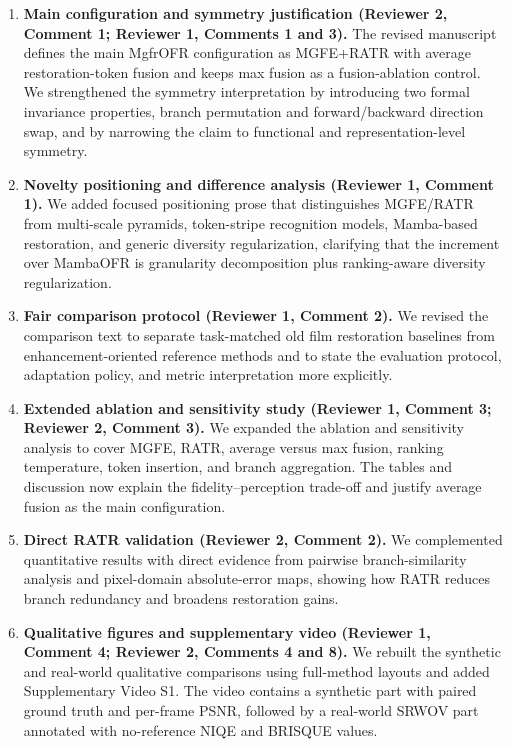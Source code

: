 \documentclass[11pt]{article}
\begin{document}
\begin{enumerate}
\item \textbf{Main configuration and symmetry justification (Reviewer 2, Comment 1; Reviewer 1, Comments 1 and 3).} The revised manuscript defines the main MgfrOFR configuration as MGFE+RATR with average restoration-token fusion and keeps max fusion as a fusion-ablation control. We strengthened the symmetry interpretation by introducing two formal invariance properties, branch permutation and forward/backward direction swap, and by narrowing the claim to functional and representation-level symmetry.

\item \textbf{Novelty positioning and difference analysis (Reviewer 1, Comment 1).} We added focused positioning prose that distinguishes MGFE/RATR from multi-scale pyramids, token-stripe recognition models, Mamba-based restoration, and generic diversity regularization, clarifying that the increment over MambaOFR is granularity decomposition plus ranking-aware diversity regularization.

\item \textbf{Fair comparison protocol (Reviewer 1, Comment 2).} We revised the comparison text to separate task-matched old film restoration baselines from enhancement-oriented reference methods and to state the evaluation protocol, adaptation policy, and metric interpretation more explicitly.

\item \textbf{Extended ablation and sensitivity study (Reviewer 1, Comment 3; Reviewer 2, Comment 3).} We expanded the ablation and sensitivity analysis to cover MGFE, RATR, average versus max fusion, ranking temperature, token insertion, and branch aggregation. The tables and discussion now explain the fidelity--perception trade-off and justify average fusion as the main configuration.

\item \textbf{Direct RATR validation (Reviewer 2, Comment 2).} We complemented quantitative results with direct evidence from pairwise branch-similarity analysis and pixel-domain absolute-error maps, showing how RATR reduces branch redundancy and broadens restoration gains.

\item \textbf{Qualitative figures and supplementary video (Reviewer 1, Comment 4; Reviewer 2, Comments 4 and 8).} We rebuilt the synthetic and real-world qualitative comparisons using full-method layouts and added Supplementary Video S1. The video contains a synthetic part with paired ground truth and per-frame PSNR, followed by a real-world SRWOV part annotated with no-reference NIQE and BRISQUE values.


\end{enumerate}
\end{document}
